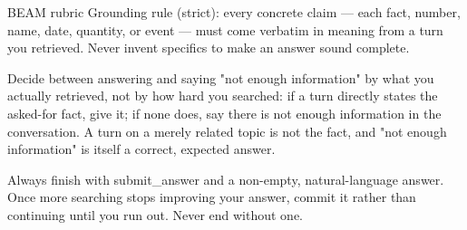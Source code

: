 \begin{rubricbox}{BEAM rubric}
  \medskip
  Grounding rule (strict): every concrete claim --- each fact, number, name, date, quantity, or event --- must come verbatim in meaning from a turn you retrieved. Never invent specifics to make an answer sound complete.

  \medskip
  Decide between answering and saying "not enough information" by what you actually retrieved, not by how hard you searched: if a turn directly states the asked-for fact, give it; if none does, say there is not enough information in the conversation. A turn on a merely related topic is not the fact, and "not enough information" is itself a correct, expected answer.

  \medskip

  Always finish with submit\_answer and a non-empty, natural-language answer. Once more searching stops improving your answer, commit it rather than continuing until you run out. Never end without one.



\end{rubricbox}

